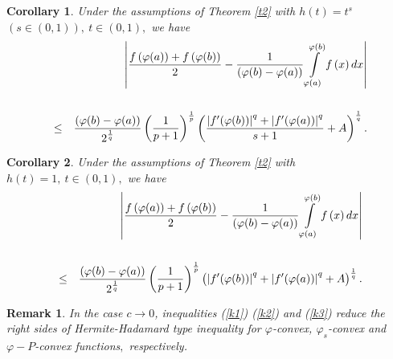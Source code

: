 \documentclass{amsart}
\theoremstyle{plain}
\newtheorem{corollary}{Corollary}
\newtheorem{remark}{Remark}
\numberwithin{equation}{section}
\begin{document}
\begin{corollary}
Under the assumptions of Theorem \ref{t2} with $h(t)=t^{s}$ $(s\in \left(
0,1\right) ),\ t\in \left( 0,1\right) ,$ we have\begin{eqnarray}
&&\left\vert \frac{f\left( \varphi (a)\right) +f\left( \varphi (b)\right) }{2}-\frac{1}{(\varphi (b)-\varphi (a))}\int\limits_{\varphi (a)}^{\varphi
(b)}f\left( x\right) dx\right\vert   \label{k2} \\
&&  \notag \\
&\leq &\dfrac{(\varphi (b)-\varphi (a))}{2^{\frac{1}{q}}}\left( \frac{1}{p+1}\right) ^{\frac{1}{p}}\left( \frac{\left\vert f^{\prime }(\varphi
(b))\right\vert ^{q}+\left\vert f^{\prime }(\varphi (a))\right\vert ^{q}}{s+1}+A\right) ^{\frac{1}{q}}.  \notag
\end{eqnarray}
\end{corollary}

\begin{corollary}
Under the assumptions of Theorem \ref{t2} with $h(t)=1,\ t\in \left(
0,1\right) ,$ we have\begin{eqnarray}
&&\left\vert \frac{f\left( \varphi (a)\right) +f\left( \varphi (b)\right) }{2}-\frac{1}{(\varphi (b)-\varphi (a))}\int\limits_{\varphi (a)}^{\varphi
(b)}f\left( x\right) dx\right\vert   \label{k3} \\
&&  \notag \\
&\leq &\dfrac{(\varphi (b)-\varphi (a))}{2^{\frac{1}{q}}}\left( \frac{1}{p+1}\right) ^{\frac{1}{p}}\left( \left\vert f^{\prime }(\varphi (b))\right\vert
^{q}+\left\vert f^{\prime }(\varphi (a))\right\vert ^{q}+A\right) ^{\frac{1}{q}}.  \notag
\end{eqnarray}
\end{corollary}

\begin{remark}
In the case $c\rightarrow 0$, inequalities (\ref{k1}) (\ref{k2}) and (\ref{k3}) reduce the right sides of Hermite-Hadamard type inequality for $\varphi $-convex, $\varphi _{s}$-convex and $\varphi -P$-convex functions$,$
respectively.
\end{remark}
\end{document}
